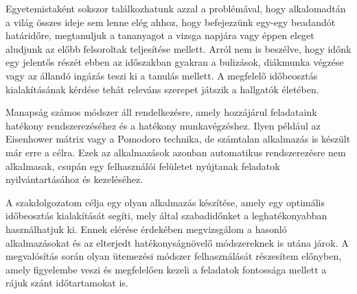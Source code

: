 
Egyetemistaként sokszor találkozhatunk azzal a problémával, hogy alkalomadtán a világ összes ideje sem lenne elég ahhoz, hogy befejezzünk egy-egy beadandót határidőre, megtanuljuk a tananyagot a vizsga napjára vagy éppen eleget aludjunk az előbb felsoroltak teljesítése mellett. Arról nem is beszélve, hogy időnk egy jelentős részét ebben az időszakban gyakran a bulizások, diákmunka végzése vagy az állandó ingázás teszi ki a tanulás mellett. A megfelelő időbeosztás kialakításának kérdése tehát releváns szerepet játszik a hallgatók életében.

Manapság számos módszer áll rendelkezésre, amely hozzájárul feladataink hatékony rendszerezéséhez és a hatékony munkavégzéshez. Ilyen például az Eisenhower mátrix vagy a Pomodoro technika, de számtalan alkalmazás is készült már erre a célra. Ezek az alkalmazások azonban automatikus rendszerezésre nem alkalmasak, csupán egy felhasználói felületet nyújtanak feladatok nyilvántartásához és kezeléséhez.

A szakdolgozatom célja egy olyan alkalmazás készítése, amely egy optimális időbeosztás kialakítását segíti, mely által szabadidőnket a leghatékonyabban használhatjuk ki. Ennek elérése érdekében megvizsgálom a hasonló alkalmazásokat és az elterjedt hatékonyságnövelő módszereknek is utána járok. A megvalósítás során olyan ütemezési módszer felhasználását részesítem előnyben, amely figyelembe veszi és megfelelően kezeli a feladatok fontossága mellett a rájuk szánt időtartamokat is.